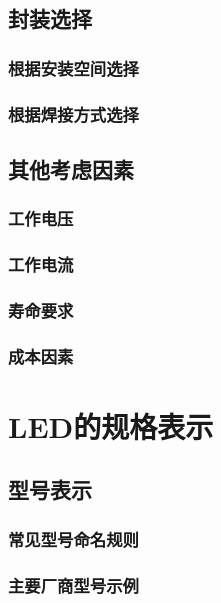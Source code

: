 \documentclass[12pt,UTF8]{ctexbook}
\begin{document}
\section{封装选择}

\subsection{根据安装空间选择}

\subsection{根据焊接方式选择}

\section{其他考虑因素}

\subsection{工作电压}

\subsection{工作电流}

\subsection{寿命要求}

\subsection{成本因素}

\chapter{LED的规格表示}

\section{型号表示}

\subsection{常见型号命名规则}

\subsection{主要厂商型号示例}
\end{document}

